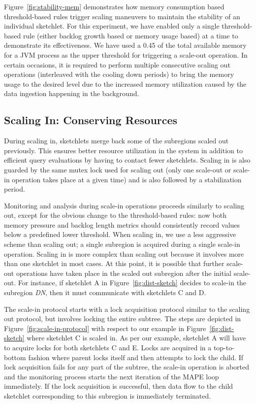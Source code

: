 Figure~\ref{fig:stability-mem} demonstrates how memory consumption based threshold-based rules trigger scaling maneuvers to maintain the stability of an individual sketchlet.
For this experiment, we have enabled only a single threshold-based rule (either backlog growth based or memory usage based) at a time to demonstrate its effectiveness.
We have used a 0.45 of the total available memory for a JVM process as the upper threshold for triggering a scale-out operation.
In certain occasions, it is required to perform multiple consecutive scaling out operations (interleaved with the cooling down periods) to bring the memory usage to the desired level due to the increased memory utilization caused by the data ingestion happening in the background.

%
\subsection{Scaling In: Conserving Resources}
During scaling in, sketchlets merge back some of the subregions scaled out previously.
This ensures better resource utilization in the system in addition to efficient query evaluations by having to contact fewer sketchlets.
Scaling in is also guarded by the same mutex lock used for scaling out (only one scale-out or scale-in operation takes place at a given time) and is also followed by a stabilization period.

Monitoring and analysis during scale-in operations proceeds similarly to scaling out, except for the obvious change to the threshold-based rules: now both memory pressure and backlog length metrics should consistently record values below a predefined lower threshold.
When scaling in, we use a less aggressive scheme than scaling out; a single subregion is acquired during a single scale-in operation.
Scaling in is more complex than scaling out because it involves more than one sketchlet in most cases.
At this point, it is possible that further scale-out operations have taken place in the scaled out subregion after the initial scale-out.
For instance, if sketchlet A in Figure~\ref{fig:dist-sketch} decides to scale-in the subregion \emph{DN}, then it must communicate with sketchlets C and D.

The scale-in protocol starts with a lock acquisition protocol similar to the scaling out protocol, but involves locking the entire subtree.
The steps are depicted in Figure~\ref{fig:scale-in-protocol} with respect to our example in Figure~\ref{fig:dist-sketch} where sketchlet C is scaled in.
As per our example, sketchlet A will have to acquire locks for both sketchlets C and E.
Locks are acquired in a top-to-bottom fashion where parent locks itself and then attempts to lock the child.
If lock acquisition fails for any part of the subtree, the scale-in operation is aborted and the monitoring process starts the next iteration of the MAPE loop immediately.
If the lock acquisition is successful, then data flow to the child sketchlet corresponding to this subregion is immediately terminated.

